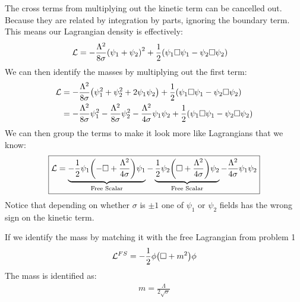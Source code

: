 \documentclass[12pt]{article}
\renewcommand{\L}{\mathcal{L}}
\begin{document}
The cross terms from multiplying out the kinetic term can be cancelled out. Because they are related by integration by parts, ignoring the boundary term. This means our Lagrangian density is effectively:
\begin{align*}
  \L&=-\frac{\Lambda^2}{8\sigma}\qty(\psi_1+\psi_2)^2
  +\frac12\qty(\psi_1\Box\psi_1-\psi_2\Box\psi_2)
\end{align*}
We can then identify the masses by multiplying out the first term:
\begin{align*}
  \L&=-\frac{\Lambda^2}{8\sigma}\qty(\psi_1^2+\psi_2^2+2\psi_1\psi_2)
  +\frac12\qty(\psi_1\Box\psi_1-\psi_2\Box\psi_2)\\
  &=-\frac{\Lambda^2}{8\sigma}\psi_1^2-\frac{\Lambda^2}{8\sigma}\psi_2^2
  -\frac{\Lambda^2}{4\sigma}\psi_1\psi_2
  +\frac12\qty(\psi_1\Box\psi_1-\psi_2\Box\psi_2)
\end{align*}
We can then group the terms to make it look more like Lagrangians that we know:
\begin{align}
  \boxed{\L=\underbrace{
    -\frac12\psi_1\qty(-\Box+\frac{\Lambda^2}{4\sigma})\psi_1
  }_{\text{Free Scalar}}
  -\underbrace{
    \frac12\psi_2\qty(\Box+\frac{\Lambda^2}{4\sigma})\psi_2
  }_{\text{Free Scalar}}
  -\frac{\Lambda^2}{4\sigma}\psi_1\psi_2}
\end{align}
Notice that depending on whether $\sigma$ is $\pm1$ one of $\psi_1$ or $\psi_2$ fields has the wrong sign on the kinetic term.

If we identify the mass by matching it with the free Lagrangian from problem 1
\begin{align*}
  \L^{FS}=-\frac12\phi\qty(\Box+m^2)\phi
\end{align*}
The mass is identified as:
\begin{align}
  \boxed{m=\frac{\Lambda}{2\sqrt{\sigma}}}
\end{align}
\end{document}
